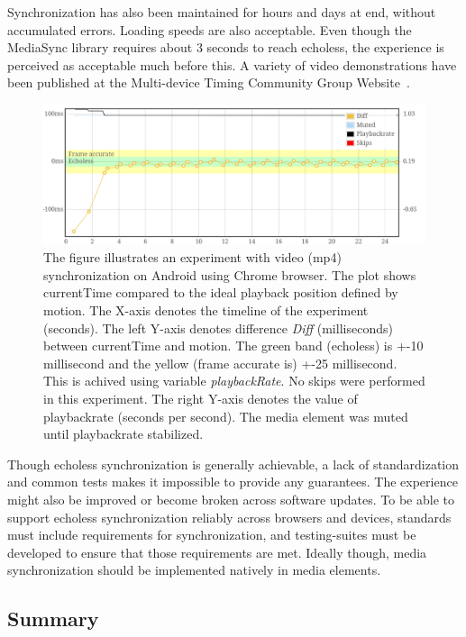 \documentclass[graybox]{svmult}
\begin{document}
Synchronization has also been maintained for hours and days at end, without
accumulated errors. Loading speeds are also acceptable. Even though the
MediaSync library requires about 3 seconds to reach echoless, the experience
is perceived as acceptable much before this. A variety of video demonstrations
have been published at the Multi-device Timing Community Group
Website~\cite{mtcg}.

\begin{figure}[h]
\centering
\includegraphics[scale=.23]{fig/android-video.png}
\caption{The figure illustrates an experiment with video (mp4) synchronization on
Android using Chrome browser. The plot shows currentTime compared to the ideal
playback position defined by motion. The X-axis denotes the timeline of the experiment (seconds).
The left Y-axis denotes difference \emph{Diff} (milliseconds) between currentTime and motion.
The green band (echoless) is +-10 millisecond and the yellow (frame accurate is) +-25 millisecond. 
This is achived using variable \emph{playbackRate}. No skips were performed in this experiment. 
The right Y-axis denotes the value of playbackrate (seconds per second). The media element was muted until playbackrate stabilized.}
\label{fig:videosync}
\end{figure}

Though echoless synchronization is generally achievable, a lack of
standardization and common tests makes it impossible to provide any
guarantees. The experience might also be improved or become broken across
software updates. To be able to support echoless synchronization reliably
across browsers and devices, standards must include requirements for
synchronization, and testing-suites must be developed to ensure that those
requirements are met. Ideally though, media synchronization should be
implemented natively in media elements.


\subsection {Summary}
\end{document}
